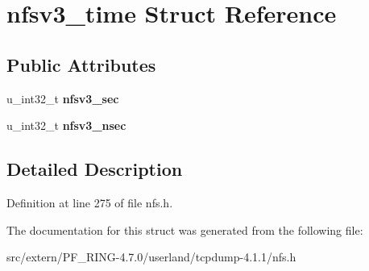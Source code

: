 \hypertarget{structnfsv3__time}{
\section{nfsv3\_\-time Struct Reference}
\label{structnfsv3__time}
}
\subsection*{Public Attributes}
\begin{DoxyCompactItemize}
\item 
\hypertarget{structnfsv3__time_ad875d6eb091f07ffa59698330fcbdc0a}{
u\_\-int32\_\-t {\bfseries nfsv3\_\-sec}}
\label{structnfsv3__time_ad875d6eb091f07ffa59698330fcbdc0a}

\item 
\hypertarget{structnfsv3__time_aaac6960e38642ced85a1769aa7f7034b}{
u\_\-int32\_\-t {\bfseries nfsv3\_\-nsec}}
\label{structnfsv3__time_aaac6960e38642ced85a1769aa7f7034b}

\end{DoxyCompactItemize}


\subsection{Detailed Description}


Definition at line 275 of file nfs.h.



The documentation for this struct was generated from the following file:\begin{DoxyCompactItemize}
\item 
src/extern/PF\_\-RING-\/4.7.0/userland/tcpdump-\/4.1.1/nfs.h\end{DoxyCompactItemize}

